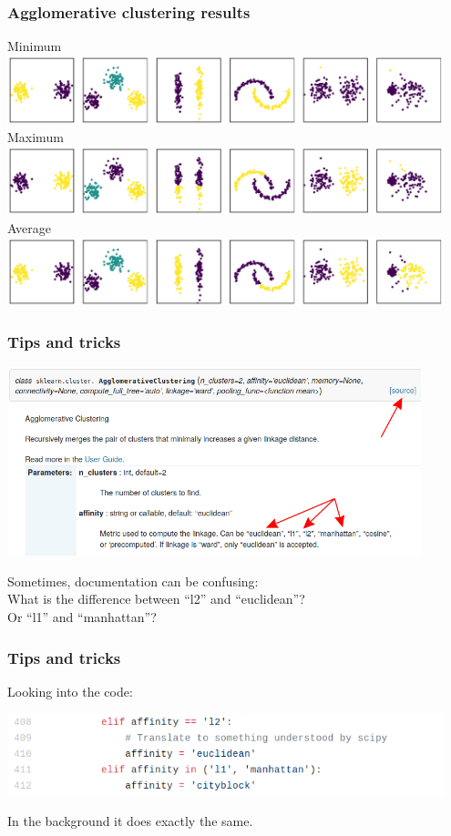 \documentclass[Nike]{tuberlinbeamer}
\begin{document}
\begin{frame}
  \frametitle{Agglomerative clustering results}
  \begin{center}
    \scriptsize Minimum
    \centering\includegraphics[width=0.95\textwidth]{agglomerative_clusters_minimum_linkage.pdf}
    \pause
    \scriptsize Maximum
    \centering\includegraphics[width=0.95\textwidth]{agglomerative_clusters_complete_linkage.pdf}
    \pause
    \scriptsize Average
    \centering\includegraphics[width=0.95\textwidth]{agglomerative_clusters_average_linkage.pdf}
  \end{center}
\end{frame}

\begin{frame}
  \frametitle{Tips and tricks}
  \begin{center}
   \centering\includegraphics[width=0.90\textwidth]{sklearn_API_doc.png}
  \end{center}
  Sometimes, documentation can be confusing:
  \\
  What is the difference between ``l2'' and ``euclidean''?
  \\
  Or ``l1'' and ``manhattan''?
\end{frame}


\begin{frame}
  \frametitle{Tips and tricks}
  Looking into the code:
  \begin{center}
    \centering\includegraphics[width=0.95\textwidth]{sklearn_code.png}
  \end{center}
  In the background it does exactly the same.
\end{frame}
\end{document}
